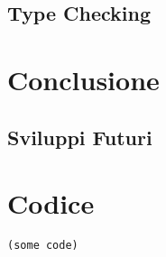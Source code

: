 \documentclass{book}
\begin{document}


\section{Type Checking}

\chapter{Conclusione}
\section{Sviluppi Futuri}

\appendix

\chapter{Codice}

\begin{lstlisting}
(some code)
\end{lstlisting}

\printbibliography[nottype=misc,title={Bibliografia}]
\printbibliography[type=misc,title={Sitografia}]
\end{document}
